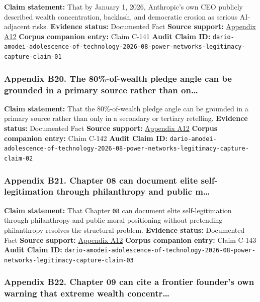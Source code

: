 \documentclass[
  american,
  11pt,
  letterpaper,
]{article}
\begin{document}
\textbf{Claim statement:} That by January 1, 2026, Anthropic's own CEO
publicly described wealth concentration, backlash, and democratic
erosion as serious AI-adjacent risks. \textbf{Evidence status:}
Documented Fact \textbf{Source support:}
\hyperref[appendix-a12-the-adolescence-of-technology]{Appendix A12}
\textbf{Corpus companion entry:} Claim C-141 \textbf{Audit Claim ID:}
\texttt{dario-amodei-adolescence-of-technology-2026-08-power-networks-legitimacy-capture-claim-01}

\subsubsection{Appendix B20. The 80\%-of-wealth pledge angle can be
grounded in a primary source rather than
on\ldots{}}\label{appendix-b20-the-80-of-wealth-pledge-angle-can-be-grounded-in-a-primary-source-rather-than-on}

\textbf{Claim statement:} That the 80\%-of-wealth pledge angle can be
grounded in a primary source rather than only in a secondary or tertiary
retelling. \textbf{Evidence status:} Documented Fact \textbf{Source
support:} \hyperref[appendix-a12-the-adolescence-of-technology]{Appendix
A12} \textbf{Corpus companion entry:} Claim C-142 \textbf{Audit Claim
ID:}
\texttt{dario-amodei-adolescence-of-technology-2026-08-power-networks-legitimacy-capture-claim-02}

\subsubsection{Appendix B21. Chapter 08 can document elite
self-legitimation through philanthropy and public
m\ldots{}}\label{appendix-b21-chapter-08-can-document-elite-self-legitimation-through-philanthropy-and-public-m}

\textbf{Claim statement:} That Chapter \texttt{08} can document elite
self-legitimation through philanthropy and public moral positioning
without pretending philanthropy resolves the structural problem.
\textbf{Evidence status:} Documented Fact \textbf{Source support:}
\hyperref[appendix-a12-the-adolescence-of-technology]{Appendix A12}
\textbf{Corpus companion entry:} Claim C-143 \textbf{Audit Claim ID:}
\texttt{dario-amodei-adolescence-of-technology-2026-08-power-networks-legitimacy-capture-claim-03}

\subsubsection{Appendix B22. Chapter 09 can cite a frontier founder's
own warning that extreme wealth
concentr\ldots{}}\label{appendix-b22-chapter-09-can-cite-a-frontier-founder-s-own-warning-that-extreme-wealth-concentr}
\end{document}
